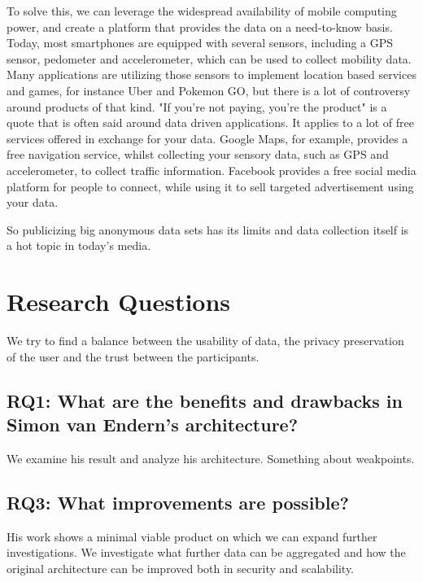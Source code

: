 To solve this, we can leverage the widespread availability of mobile computing power, and create a platform that provides the data on a need-to-know basis. Today, most smartphones are equipped with several sensors, including a GPS sensor, pedometer and accelerometer, which can be used to collect mobility data. Many applications are utilizing those sensors to implement location based services and games, for instance Uber and Pokemon GO, but there is a lot of controversy around products of that kind. "If you're not paying, you're the product" is a quote that is often said around data driven applications.
It applies to a lot of free services offered in exchange for your data. Google Maps, for example, provides a free navigation service, whilst collecting your sensory data, such as GPS and accelerometer, to collect traffic information. Facebook provides a free social media platform for people to connect, while using it to sell targeted advertisement using your data.

So publicizing big anonymous data sets has its limits and data collection itself is a hot topic in today's media. 

\section{Research Questions}
We try to find a balance between the usability of data, the privacy preservation of the user and the trust between the participants.
\subsection*{RQ1: What are the benefits and drawbacks in Simon van Endern's architecture?}
We examine his result and analyze his architecture. Something about weakpoints.
\subsection*{RQ3: What improvements are possible?}
His work shows a minimal viable product on which we can expand further investigations. We investigate what further data can be aggregated and how the original architecture can be improved both in security and scalability.
